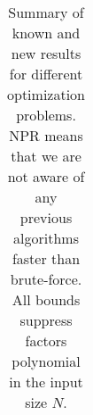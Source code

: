 \documentclass[manuscript,screen,review]{acmart}
\begin{document}
\begin{table}[t]
{\begin{tabular}{l l l l l}
      \bottomrule
    \end{tabular}

  }
  \caption{\label{fig:vertexresults}Summary of known and new results for different 
    optimization problems.
  NPR means  that we are not aware of any previous algorithms faster than brute-force. All bounds suppress factors polynomial in the input size $N$.}
\end{table}


\printbibliography
\end{document}
